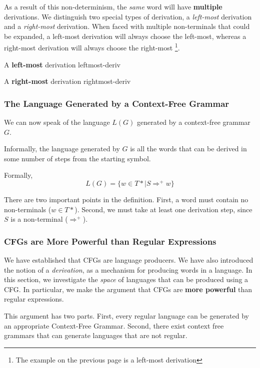 As a result of this non-determinism, the \textit{same} word will have \textbf{multiple} derivations. We distinguish two special types of derivation, a \textit{left-most} derivation and a \textit{right-most} derivation. When faced with multiple non-terminals that could be expanded, a left-most derivation will always choose the left-most, whereas a right-most derivation will always choose the right-most \footnote{The example on the previous page is a left-most derivation}. \label{definition:leftmostderivation}

\begin{minipage}[t]{.5\textwidth}
    A \textbf{left-most} derivation
    {leftmost-deriv}
\end{minipage}%
\begin{minipage}[t]{.5\textwidth}
    A \textbf{right-most} derivation
    {rightmost-deriv}
\end{minipage}

\subsubsection{The Language Generated by a Context-Free Grammar}
We can now speak of the language $L(G)$ generated by a context-free grammar $G$.

Informally, the language generated by $G$ is all the words that can be derived in some number of steps from the starting symbol. 

Formally, 
\[L(G) = \{w \in T* \mid S \Rightarrow^{+} w \}\]

There are two important points in the definition. First, a word must contain no non-terminals ($w \in T*$). Second, we must take at least one derivation step, since $S$ is a non-terminal ($\Rightarrow^{+}$). 

\subsubsection{CFGs are More Powerful than Regular Expressions}
We have established that CFGs are language producers. We have also introduced the notion of a \textit{derivation}, as a mechanism for producing words in a language. In this section, we investigate the \textit{space} of languages that can be produced using a CFG. In particular, we make the argument that CFGs are \textbf{more powerful} than regular expressions. 

This argument has two parts. First, every regular language can be generated by an appropriate Context-Free Grammar. Second, there exist context free grammars that can generate languages that are not regular. 

